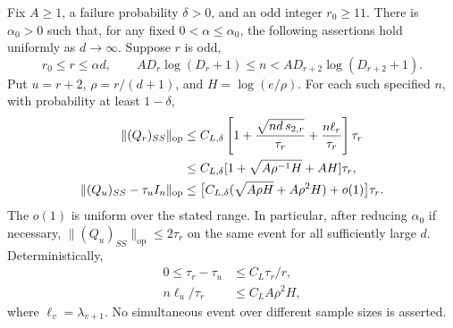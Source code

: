 \begin{lemma}\label{lem:sparse-gram}
Fix $A\ge1$, a failure probability $\delta>0$, and an odd integer
$r_0\ge11$. There is $\alpha_0>0$ such that, for any fixed
$0<\alpha\le\alpha_0$, the following assertions hold uniformly as
$d\to\infty$. Suppose $r$ is odd,
\[
 r_0\le r\le\alpha d,\qquad
 A D_r\log(D_r+1)\le n<A D_{r+2}\log(D_{r+2}+1).
\]
Put $u=r+2$, $\rho=r/(d+1)$, and $H=\log(e/\rho)$.
For each such specified $n$, with probability at least $1-\delta$,
\begin{align}
 \|(Q_r)_{SS}\|_{\mathrm{op}}
 &\le C_{L,\delta}\left[1+\frac{\sqrt{nd\,s_{2,r}}}{\tau_r}
                   +\frac{n\ell_r}{\tau_r}\right]\tau_r
 \notag\\
 &\le C_{L,\delta}
       [1+\sqrt{A\rho^{-1}H}+AH]\tau_r,
       \label{eq:sparse-coarse-gram}\\
 \|(Q_u)_{SS}-\tau_uI_n\|_{\mathrm{op}}
 &\le\bigl[C_{L,\delta}
       (\sqrt{A\rho H}+A\rho^2H)+o(1)\bigr]\tau_r.
       \label{eq:sparse-fine-gram}
\end{align}
The $o(1)$ is uniform over the stated range. In particular, after
reducing $\alpha_0$ if necessary,
$\|(Q_u)_{SS}\|_{\mathrm{op}}\le2\tau_r$ on the same event for all
sufficiently large $d$. Deterministically,
\begin{align}
 0\le\tau_r-\tau_u&\le C_L\tau_r/r,
       \label{eq:gram-sparse-band-trace}\\
 n\ell_u/\tau_r&\le C_LA\rho^2H,
       \label{eq:sparse-fine-eigenvalue}
\end{align}
where $\ell_v=\lambda_{v+1}$. No simultaneous event over different
sample sizes is asserted.
\end{lemma}
